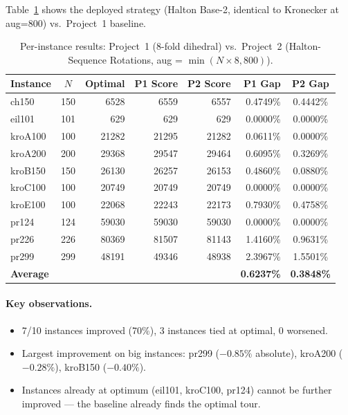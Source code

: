 \documentclass[11pt,a4paper]{article}
\begin{document}
Table~\ref{tab:perinstance} shows the deployed strategy (Halton Base-2,
identical to Kronecker at aug=800) vs.\ Project~1 baseline.

\begin{table}[h]
\centering
\caption{Per-instance results: Project~1 (8-fold dihedral) vs.\ Project~2
(Halton-Sequence Rotations, aug = $\min(N{\times}8, 800)$).}
\label{tab:perinstance}
\small
\begin{tabular}{@{}lcrrrrc@{}}
\toprule
\textbf{Instance} & $N$ & \textbf{Optimal} & \textbf{P1 Score} & \textbf{P2 Score} & \textbf{P1 Gap} & \textbf{P2 Gap} \\
\midrule
ch150 & 150 & 6528 & 6559 & 6557 & 0.4749\% & 0.4442\% \\
eil101 & 101 & 629 & 629 & 629 & 0.0000\% & 0.0000\% \\
kroA100 & 100 & 21282 & 21295 & 21282 & 0.0611\% & 0.0000\% \\
kroA200 & 200 & 29368 & 29547 & 29464 & 0.6095\% & 0.3269\% \\
kroB150 & 150 & 26130 & 26257 & 26153 & 0.4860\% & 0.0880\% \\
kroC100 & 100 & 20749 & 20749 & 20749 & 0.0000\% & 0.0000\% \\
kroE100 & 100 & 22068 & 22243 & 22173 & 0.7930\% & 0.4758\% \\
pr124 & 124 & 59030 & 59030 & 59030 & 0.0000\% & 0.0000\% \\
pr226 & 226 & 80369 & 81507 & 81143 & 1.4160\% & 0.9631\% \\
pr299 & 299 & 48191 & 49346 & 48938 & 2.3967\% & 1.5501\% \\
\midrule
\textbf{Average} & & & & & \textbf{0.6237\%} & \textbf{0.3848\%} \\
\bottomrule
\end{tabular}
\end{table}

\paragraph{Key observations.}
\begin{itemize}
  \item 7/10 instances improved (70\%), 3 instances tied at optimal, 0 worsened.
  \item Largest improvement on big instances: pr299 ($-0.85\%$ absolute),
        kroA200 ($-0.28\%$), kroB150 ($-0.40\%$).
  \item Instances already at optimum (eil101, kroC100, pr124) cannot be
        further improved --- the baseline already finds the optimal tour.
\end{itemize}
\end{document}
